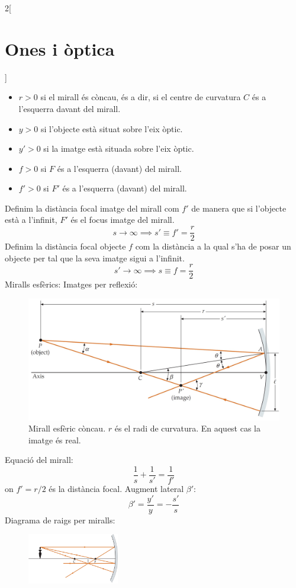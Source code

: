 \documentclass[class=article,10pt,crop=false]{standalone}
\begin{document}
\begin{multicols}{2}[\section{Ones i òptica}]
\begin{itemize}
    \item $r>0$ si el mirall és còncau, és a dir, si el centre de curvatura $C$ és a l'esquerra davant del mirall.
    \item $y>0$ si l'objecte està situat sobre l'eix òptic.
    \item $y'>0$ si la imatge està situada sobre l'eix òptic.
    \item $f>0$ si $F$ és a l'esquerra (davant) del mirall.
    \item $f'>0$ si $F'$ és a l'esquerra (davant) del mirall.
\end{itemize}
Definim la distància focal imatge del mirall com $f'$ de manera que si l'objecte està a l'infinit, $F'$ és el focus imatge del mirall. $$s\to\infty\implies s'\equiv f'=\frac{r}{2}$$ Definim la distància focal objecte $f$ com la distància a la qual s'ha de posar un objecte per tal que la seva imatge sigui a l'infinit. $$s'\to\infty\implies s\equiv f=\frac{r}{2}$$
Miralls esfèrics:\newline
Imatges per reflexió:\newline
\begin{figure}
    \centering
    \includegraphics[width=\linewidth]{Physics/1st/Ones_i_optica/Imatges/conc.jpg} 
    \caption{Mirall esfèric còncau. $r$ és el radi de curvatura. En aquest cas la imatge és real.}
\end{figure}
Equació del mirall:
$$\frac{1}{s}+\frac{1}{s'}=\frac{1}{f'}$$ {\footnotesize on $f'=r/2$ és la distància focal.}\newline 
Augment lateral $\beta'$:
$$\beta'=\frac{y'}{y}=-\frac{s'}{s}$$
Diagrama de raigs per miralls:\newline
\begin{figure}
    \centering
    \includegraphics[width=4cm]{Physics/1st/Ones_i_optica/Imatges/raigs.jpg} 

\end{figure}
\end{multicols}
\end{document}
